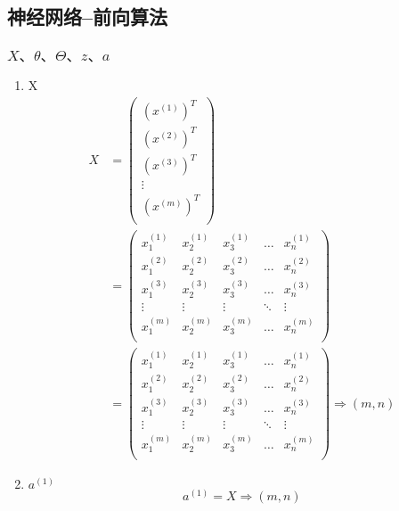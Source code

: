 \subsection{神经网络--前向算法}

\subsubsection{$X、\theta、\Theta、z、a$}
\begin{enumerate}
\item X
\begin{equation} \begin{aligned}
	X & = \left(\begin{matrix}
			(x^{(1)})^T \\ (x^{(2)})^T \\ (x^{(3)})^T \\ \vdots \\ (x^{(m)})^T \\
		\end{matrix}\right) \\
	& = \left( \begin{matrix}
			x_1^{(1)} & x_2^{(1)} & x_3^{(1)} & \dots & x_n^{(1)} \\
			x_1^{(2)} & x_2^{(2)} & x_3^{(2)} & \dots & x_n^{(2)} \\
			x_1^{(3)} & x_2^{(3)} & x_3^{(3)} & \dots & x_n^{(3)} \\
			\vdots    & \vdots    & \vdots    & \ddots & \vdots   \\
			x_1^{(m)} & x_2^{(m)} & x_3^{(m)} & \dots & x_n^{(m)} \\
			\end{matrix}\right) \\
	& = \left(\begin{matrix}
			x_1^{(1)} & x_2^{(1)} & x_3^{(1)} & \dots & x_n^{(1)} \\
			x_1^{(2)} & x_2^{(2)} & x_3^{(2)} & \dots & x_n^{(2)} \\
			x_1^{(3)} & x_2^{(3)} & x_3^{(3)} & \dots & x_n^{(3)} \\
			\vdots    & \vdots    & \vdots    & \ddots & \vdots   \\
			x_1^{(m)} & x_2^{(m)} & x_3^{(m)} & \dots & x_n^{(m)} \\
		\end{matrix}\right) \Rightarrow {(m,n)}
\end{aligned} \end{equation}

\item $a^{(1)}$
\begin{equation}
	a^{(1)} = X  \Rightarrow {(m,n)}
\end{equation}


\end{enumerate}
